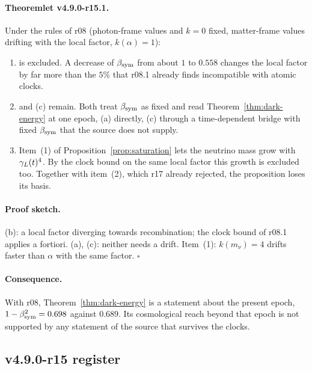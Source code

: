 \paragraph{Theoremlet v4.9.0-r15.1.}
Under the rules of r08 (photon-frame values and \(k=0\) fixed, matter-frame values drifting with the local factor,
\(k(\alpha)=1\)):
\begin{enumerate}[leftmargin=2em]
\item[(b)] is excluded.  A decrease of \(\beta_{\mathrm{sym}}\) from about \(1\) to \(0.558\) changes the local factor by far more than the
\(5\%\) that r08.1 already finds incompatible with atomic clocks.
\item[(a)] and (c) remain.  Both treat \(\beta_{\mathrm{sym}}\) as fixed and read Theorem~\ref{thm:dark-energy} at one epoch, (a) directly,
(c) through a time-dependent bridge with fixed \(\beta_{\mathrm{sym}}\) that the source does not supply.
\item Item~(1) of Proposition~\ref{prop:saturation} lets the neutrino mass grow with \(\gamma_L(t)^4\).  By the clock bound on the
same local factor this growth is excluded too.  Together with item~(2), which r17 already rejected, the proposition loses
its basis.
\end{enumerate}

\paragraph{Proof sketch.}
(b): a local factor diverging towards recombination; the clock bound of r08.1 applies a fortiori.  (a), (c): neither needs a
drift.  Item~(1): \(k(m_\nu)=4\) drifts faster than \(\alpha\) with the same factor.  \(\square\)

\paragraph{Consequence.}
With r08, Theorem~\ref{thm:dark-energy} is a statement about the present epoch, \(1-\beta_{\mathrm{sym}}^2=0.698\) against \(0.689\).
Its cosmological reach beyond that epoch is not supported by any statement of the source that survives the clocks.

\subsection*{v4.9.0-r15 register}
\label{subsec:v490-r15-register}

